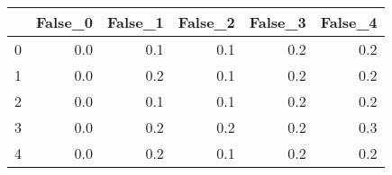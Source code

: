 \begin{tabular}{lrrrrr}
\toprule
{} &  False\_0 &  False\_1 &  False\_2 &  False\_3 &  False\_4 \\ \hline
\midrule
0 &      0.0 &      0.1 &      0.1 &      0.2 &      0.2 \\ \hline
1 &      0.0 &      0.2 &      0.1 &      0.2 &      0.2 \\ \hline
2 &      0.0 &      0.1 &      0.1 &      0.2 &      0.2 \\ \hline
3 &      0.0 &      0.2 &      0.2 &      0.2 &      0.3 \\ \hline
4 &      0.0 &      0.2 &      0.1 &      0.2 &      0.2 \\ \hline
\bottomrule
\end{tabular}
